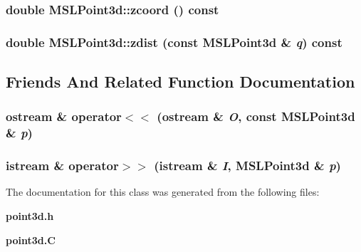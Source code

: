 \subsubsection{\setlength{\rightskip}{0pt plus 5cm}double MSLPoint3d::zcoord () const\hspace{0.3cm}{\tt  [inline]}}\label{classMSLPoint3d_a5}


\subsubsection{\setlength{\rightskip}{0pt plus 5cm}double MSLPoint3d::zdist (const MSLPoint3d \& {\em q}) const}\label{classMSLPoint3d_a12}




\subsection{Friends And Related Function Documentation}
\subsubsection{\setlength{\rightskip}{0pt plus 5cm}ostream \& operator$<$$<$ (ostream \& {\em O}, const MSLPoint3d \& {\em p})\hspace{0.3cm}{\tt  [friend]}}\label{classMSLPoint3d_l0}


\subsubsection{\setlength{\rightskip}{0pt plus 5cm}istream \& operator$>$$>$ (istream \& {\em I}, MSLPoint3d \& {\em p})\hspace{0.3cm}{\tt  [friend]}}\label{classMSLPoint3d_l1}




The documentation for this class was generated from the following files:\begin{CompactItemize}
\item 
{\bf point3d.h}\item 
{\bf point3d.C}\end{CompactItemize}
